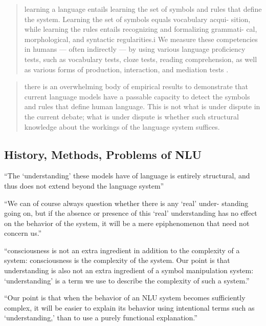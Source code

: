\begin{quote}
  learning a language entails learning the set of symbols and rules that define the
  system. Learning the set of symbols equals vocabulary acqui- sition, while learning
  the rules entails recognizing and formalizing grammati- cal, morphological, and
  syntactic regularities.i We measure these competencies in humans — often indirectly
  — by using various language proficiency tests, such as vocabulary tests, cloze
  tests, reading comprehension, as well as various forms of production, interaction,
  and mediation tests \textelp{}. \cite{sahlgren2021singleton}
\end{quote}

\begin{quote}
  there is an overwhelming body of empirical results to demonstrate that current language models
  have a passable capacity to detect the symbols and rules that define human language. This is not
  what is under dispute in the current debate; what is under dispute is whether such structural
  knowledge about the workings of the language system suffices.
\end{quote}

\subsection{History, Methods, Problems of NLU}


``The `understanding' these models have of language is entirely structural,
and thus does not extend beyond the language system'' \cite{sahlgren2021singleton}

``We can of course always question whether there is any `real' under-
standing going on, but if the absence or presence of this `real' understanding
has no effect on the behavior of the system, it will be a mere epiphenomenon
that need not concern us.'' \cite{sahlgren2021singleton}

``consciousness is not an extra ingredient in addition to the complexity of a system:
consciousness is the complexity of the system. Our point is that understanding is also
not an extra ingredient of a symbol manipulation system: `understanding' is a term we
use to describe the complexity of such a system.'' \cite{sahlgren2021singleton}

``Our point is that when the behavior of an NLU system becomes sufficiently complex, it will be
easier to explain its behavior using intentional terms such as `understanding,' than to use a
purely functional explanation.'' \cite{sahlgren2021singleton}

